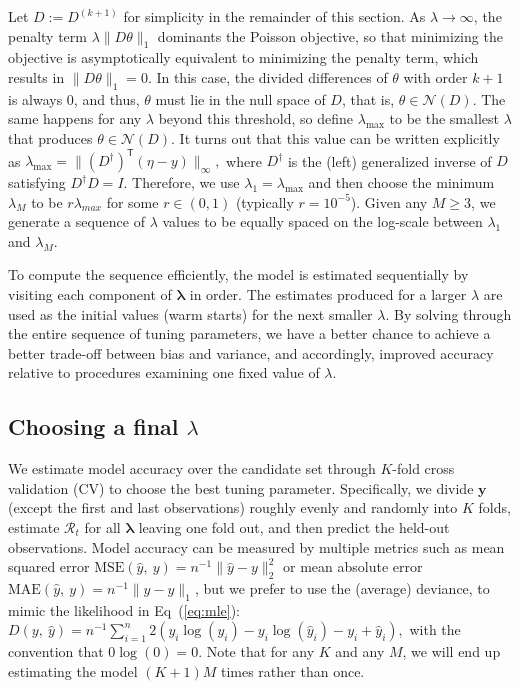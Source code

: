 \documentclass[10pt,letterpaper]{article}
\newcommand{\lr}[1]{\left(#1\right)}
\newcommand{\snorm}[1]{\lVert #1 \rVert}
\def\bfy{\mathbf{y}}
\def\calR{\mathcal{R}}
\renewcommand{\top}{\mathsf{T}}
\renewcommand{\eqref}[1]{Eq~(\ref{#1})}
\begin{document}
Let $D := D^{(k+1)}$ for simplicity in the remainder of this section. As
$\lambda \to\infty$, the penalty term $\lambda \snorm{D\theta}_1$ dominants the
Poisson objective, so that minimizing the objective is asymptotically equivalent
to minimizing the penalty term, which results in $\snorm{D\theta}_1 = 0$. In
this case, the divided differences of $\theta$ with order $k+1$ is always $0$,
and thus, $\theta$ must lie in the null space of $D$, that is,
$\theta\in\mathcal{N}(D)$. The same happens for any $\lambda$ beyond this
threshold, so define $\lambda_{\textrm{max}}$ to be the smallest $\lambda$ that
produces $\theta\in\mathcal{N}(D)$. It turns out that this value can be written
explicitly as $\lambda_{\textrm{max}} = \snorm{\lr{D^{\dagger}}^{\top} \lr{\eta
- y}}_{\infty},$ where $D^{\dagger}$ is the (left) generalized inverse of $D$
satisfying $D^{\dagger} D = I$. Therefore, we use $\lambda_1 =
\lambda_{\textrm{max}}$ and then choose the minimum $\lambda_M$ to be
$r\lambda_{max}$ for some $r \in (0,1)$ (typically $r=10^{-5}$). Given any
$M\geq 3$, we generate a sequence of $\lambda$ values to be equally spaced on
the log-scale between $\lambda_1$ and $\lambda_M$. 

To compute the sequence efficiently, the model is estimated sequentially by
visiting each component of $\boldsymbol{\lambda}$ in order. The estimates
produced for a larger $\lambda$ are used as the initial values (warm starts) for
the next smaller $\lambda$. By solving through the entire sequence of tuning
parameters, we have a better chance to achieve a better trade-off between bias
and variance, and accordingly, improved accuracy relative to procedures
examining one fixed value of $\lambda$.


\subsection{Choosing a final $\lambda$}
\label{sec:cv}

We estimate model accuracy over the candidate set through $K$-fold cross
validation (CV) to choose the best tuning parameter. Specifically, we divide
$\bfy$ (except the first and last observations) roughly evenly and randomly into
$K$ folds, estimate $\calR_t$ for all $\boldsymbol{\lambda}$ leaving one fold
out, and then predict the held-out observations. Model accuracy can be measured
by multiple metrics such as mean squared error $\mathrm{MSE}(\widehat{y},\ y) =
n^{-1}\snorm{\widehat{y} - y}_2^2$ or mean absolute error
$\mathrm{MAE}(\widehat{y},\ y) = n^{-1}\snorm{\widehat{y} - y}_1$, but we prefer
to use the (average) deviance, to mimic the likelihood in \eqref{eq:mle}:
$D\lr{y,\ \hat{y}} = n^{-1}\sum_{i=1}^n 2\lr{y_i \log(y_i) - y_i\log(\hat{y}_i)
- y_i + \hat{y}_i},$ with the convention that $0\log(0) = 0$. Note that for any $K$ and any $M$, we will end up 
estimating the model $(K+1)M$ times rather than once.
\end{document}
